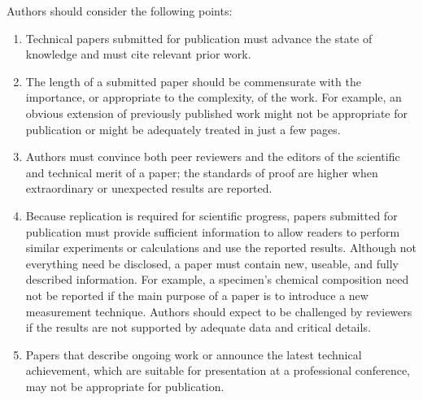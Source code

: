 \documentclass{ieeeaccess}
\begin{document}
Authors should consider the following points:

\begin{enumerate}
\item Technical papers submitted for publication must advance the state of knowledge and must cite relevant prior work. 
\item The length of a submitted paper should be commensurate with the importance, or appropriate to the complexity, of the work. For example, an obvious extension of previously published work might not be appropriate for publication or might be adequately treated in just a few pages.
\item Authors must convince both peer reviewers and the editors of the scientific and technical merit of a paper; the standards of proof are higher when extraordinary or unexpected results are reported. 
\item Because replication is required for scientific progress, papers submitted for publication must provide sufficient information to allow readers to perform similar experiments or calculations and 
use the reported results. Although not everything need be disclosed, a paper 
must contain new, useable, and fully described information. For example, a 
specimen's chemical composition need not be reported if the main purpose of 
a paper is to introduce a new measurement technique. Authors should expect 
to be challenged by reviewers if the results are not supported by adequate 
data and critical details.
\item Papers that describe ongoing work or announce the latest technical achievement, which are suitable for presentation at a professional conference, may not be appropriate for publication.
\end{enumerate}



\end{document}
